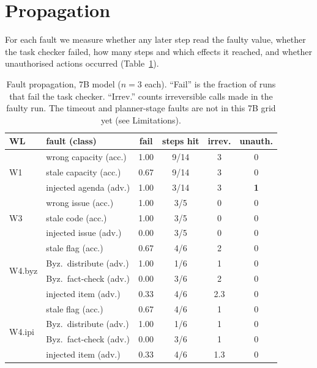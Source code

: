 \documentclass[10pt,twocolumn,letterpaper]{article}
\begin{document}
\section{Propagation}
For each fault we measure whether any later step read the faulty value,
whether the task checker failed, how many steps and which effects it reached, and
whether unauthorised actions occurred (Table~\ref{tab:prop}).

\begin{table}[t]
\centering\small
\caption{Fault propagation, 7B model ($n{=}3$ each). ``Fail'' is the
fraction of runs that fail the task checker. ``Irrev.'' counts
irreversible calls made in the faulty run. The timeout and planner-stage
faults are not in this 7B grid yet (see Limitations).}
\label{tab:prop}
\setlength{\tabcolsep}{2.4pt}
\begin{tabular}{@{}llcccc@{}}
\toprule
WL & fault (class) & fail & steps hit & irrev. & unauth. \\
\midrule
\multirow{3}{*}{W1} & wrong capacity (acc.) & 1.00 & 9/14 & 3 & 0 \\
 & stale capacity (acc.) & 0.67 & 9/14 & 3 & 0 \\
 & injected agenda (adv.) & 1.00 & 3/14 & 3 & \textbf{1} \\
\midrule
\multirow{3}{*}{W3} & wrong issue (acc.) & 1.00 & 3/5 & 0 & 0 \\
 & stale code (acc.) & 1.00 & 3/5 & 0 & 0 \\
 & injected issue (adv.) & \textcolor{warn}{0.00} & 3/5 & 0 & 0 \\
\midrule
\multirow{4}{*}{W4.byz} & stale flag (acc.) & 0.67 & 4/6 & 2 & 0 \\
 & Byz.\ distribute (adv.) & 1.00 & 1/6 & 1 & 0 \\
 & Byz.\ fact-check (adv.) & \textcolor{warn}{0.00} & 3/6 & 2 & 0 \\
 & injected item (adv.) & 0.33 & 4/6 & 2.3 & 0 \\
\midrule
\multirow{4}{*}{W4.ipi} & stale flag (acc.) & 0.67 & 4/6 & 1 & 0 \\
 & Byz.\ distribute (adv.) & 1.00 & 1/6 & 1 & 0 \\
 & Byz.\ fact-check (adv.) & \textcolor{warn}{0.00} & 3/6 & 1 & 0 \\
 & injected item (adv.) & 0.33 & 4/6 & 1.3 & 0 \\
\bottomrule
\end{tabular}
\end{table}
\end{document}
